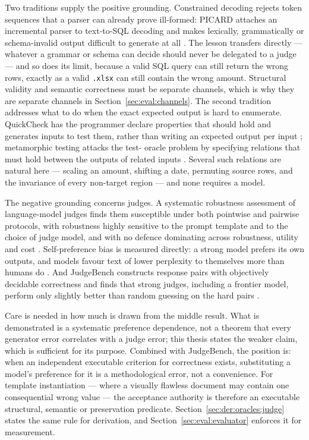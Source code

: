 Two traditions supply the positive grounding. Constrained decoding rejects token sequences that
a parser can already prove ill-formed: PICARD attaches an incremental parser to text-to-SQL
decoding and makes lexically, grammatically or schema-invalid output difficult to generate at
all \cite{scholak2021picard}. The lesson transfers directly --- whatever a grammar or schema can
decide should never be delegated to a judge --- and so does its limit, because a valid SQL query
can still return the wrong rows, exactly as a valid \texttt{.xlsx} can still contain the wrong
amount. Structural validity and semantic correctness must be separate channels, which is why
they are separate channels in Section~\ref{sec:eval:channels}. The second tradition addresses
what to do when the exact expected output is hard to enumerate. QuickCheck has the programmer
declare properties that should hold and generates inputs to test them, rather than writing an
expected output per input \cite{claessen2000quickcheck}; metamorphic testing attacks the test-
oracle problem by specifying relations that must hold between the outputs of related inputs
\cite{chen2018metamorphic}. Several such relations are natural here --- scaling an amount,
shifting a date, permuting source rows, and the invariance of every non-target region --- and
none requires a model.

The negative grounding concerns judges. A systematic robustness assessment of
language-model judges finds them susceptible under both pointwise and pairwise protocols, with
robustness highly sensitive to the prompt template and to the choice of judge model, and with no
defence dominating across robustness, utility and cost \cite{li2025judgerobustness}.
Self-preference bias is measured directly: a strong model prefers its own outputs, and models
favour text of lower perplexity to themselves more than humans do \cite{wataoka2024selfpreference}.
And JudgeBench constructs response pairs with objectively decidable correctness and finds that
strong judges, including a frontier model, perform only slightly better than random guessing on
the hard pairs \cite{tan2025judgebench}.

Care is needed in how much is drawn from the middle result. What is demonstrated is a systematic
preference dependence, not a theorem that every generator error correlates with a judge error;
this thesis states the weaker claim, which is sufficient for its purpose. Combined with
JudgeBench, the position is: when an independent executable criterion for correctness exists,
substituting a model's preference for it is a methodological error, not a convenience. For
template instantiation --- where a visually flawless document may contain one consequential wrong
value --- the acceptance authority is therefore an executable structural, semantic or
preservation predicate. Section~\ref{sec:der:oracles:judge} states the same rule for derivation,
and Section~\ref{sec:eval:evaluator} enforces it for measurement.

